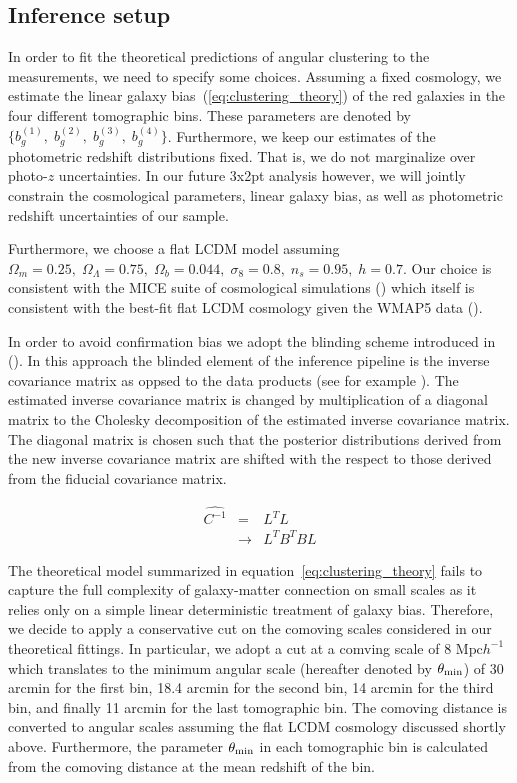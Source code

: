 \documentclass[fleqn,usenatbib,useAMS]{mnras}
\begin{document}
\subsection{Inference setup}

In order to fit the theoretical predictions of angular clustering to the measurements, we need to specify some choices. Assuming a fixed cosmology, we estimate the linear galaxy bias~(\ref{eq:clustering_theory}) of the red galaxies in the four different tomographic bins. These parameters are denoted by $\{b^{(1)}_g, \; b^{(2)}_g, \; b^{(3)}_g, \; b^{(4)}_g\}$. Furthermore, we keep our estimates of the photometric redshift distributions fixed. That is, we do not marginalize over photo-$z$ uncertainties. In our future 3x2pt analysis however, we will jointly constrain the cosmological parameters, linear galaxy bias, as well as photometric redshift uncertainties of our sample. 

Furthermore, we choose a flat LCDM model assuming $\Omega_m = 0.25, \;\Omega_{\Lambda} = 0.75, \; \Omega_b = 0.044, \; \sigma_{8} = 0.8, \; n_s = 0.95, \; h = 0.7$. Our choice is consistent with the MICE suite of cosmological simulations (\citealt{MICE1}) which itself is consistent with the best-fit flat LCDM cosmology given the WMAP5 data (\citealt{WMAP5}). 

In order to avoid confirmation bias we adopt the blinding scheme introduced in (\citealt{sellentin2019}). In this approach the blinded element of the inference pipeline is the inverse covariance matrix as oppsed to the data products (see for example \citealt{hendrick2017, hendrik2018}). The estimated inverse covariance matrix is changed by multiplication of a diagonal matrix to the Cholesky decomposition of the estimated inverse covariance matrix. The diagonal matrix is chosen such that the posterior distributions derived from the new inverse covariance matrix are shifted with the respect to those derived from the fiducial covariance matrix. 

\begin{eqnarray}
\hat{C^{-1}} &=& L^{T}L \\
             &\rightarrow& L^{T}B^{T}BL
\end{eqnarray}

The theoretical model summarized in equation~\ref{eq:clustering_theory} fails to capture the full complexity of galaxy-matter connection on small scales as it relies only on a simple linear deterministic treatment of galaxy bias. Therefore, we decide to apply a conservative cut on the comoving scales considered in our theoretical fittings. In particular, we adopt a cut at a comving scale of 8 $\mathrm{Mpc}h^{-1}$ which translates to the minimum angular scale (hereafter denoted by $\theta_{\rm min}$) of 30 arcmin for the first bin, 18.4 arcmin for the second bin, 14 arcmin for the third bin, and finally 11 arcmin for the last tomographic bin. The comoving distance is converted to angular scales assuming the flat LCDM cosmology discussed shortly above. Furthermore, the parameter $\theta_{\rm min}$ in each tomographic bin is calculated from the comoving distance at the mean redshift of the bin.
\end{document}
